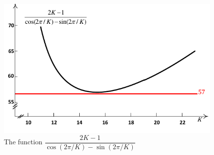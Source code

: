 \documentclass[review]{elsarticle}
\begin{document}
\begin{figure}[h]
  \centering
  \includegraphics[scale=.7]{Figs/fig3.pdf}
  \vspace{-10pt}
  \caption{The function ${ \dfrac{2K-1}{\cos(2\pi/K)-\sin(2\pi/K)} }$ }
  \label{fig:function}
\end{figure}
\end{document}

